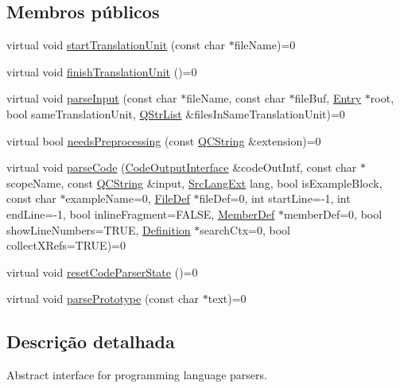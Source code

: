 \subsection*{Membros públicos}
\begin{DoxyCompactItemize}
\item 
virtual void \hyperlink{class_parser_interface_ae9d9d869020d0d90f48d67f6a211bf57}{start\-Translation\-Unit} (const char $\ast$file\-Name)=0
\item 
virtual void \hyperlink{class_parser_interface_afeb7f0c0fa300a57fbbc5bceb2795f3a}{finish\-Translation\-Unit} ()=0
\item 
virtual void \hyperlink{class_parser_interface_a1788757b1264f4d4abf6c5bee8cb50dd}{parse\-Input} (const char $\ast$file\-Name, const char $\ast$file\-Buf, \hyperlink{class_entry}{Entry} $\ast$root, bool same\-Translation\-Unit, \hyperlink{class_q_str_list}{Q\-Str\-List} \&files\-In\-Same\-Translation\-Unit)=0
\item 
virtual bool \hyperlink{class_parser_interface_a9f137118e8804d57ea8ebe6a7d711703}{needs\-Preprocessing} (const \hyperlink{class_q_c_string}{Q\-C\-String} \&extension)=0
\item 
virtual void \hyperlink{class_parser_interface_a8e684ab861915fbec41adfaec153d304}{parse\-Code} (\hyperlink{class_code_output_interface}{Code\-Output\-Interface} \&code\-Out\-Intf, const char $\ast$scope\-Name, const \hyperlink{class_q_c_string}{Q\-C\-String} \&input, \hyperlink{types_8h_a9974623ce72fc23df5d64426b9178bf2}{Src\-Lang\-Ext} lang, bool is\-Example\-Block, const char $\ast$example\-Name=0, \hyperlink{class_file_def}{File\-Def} $\ast$file\-Def=0, int start\-Line=-\/1, int end\-Line=-\/1, bool inline\-Fragment=F\-A\-L\-S\-E, \hyperlink{class_member_def}{Member\-Def} $\ast$member\-Def=0, bool show\-Line\-Numbers=T\-R\-U\-E, \hyperlink{class_definition}{Definition} $\ast$search\-Ctx=0, bool collect\-X\-Refs=T\-R\-U\-E)=0
\item 
virtual void \hyperlink{class_parser_interface_a8b14ce8c51a4d99ae293916de928debc}{reset\-Code\-Parser\-State} ()=0
\item 
virtual void \hyperlink{class_parser_interface_a3cc425322ee83a0c02243a68b7bacbad}{parse\-Prototype} (const char $\ast$text)=0
\end{DoxyCompactItemize}


\subsection{Descrição detalhada}
Abstract interface for programming language parsers. 

